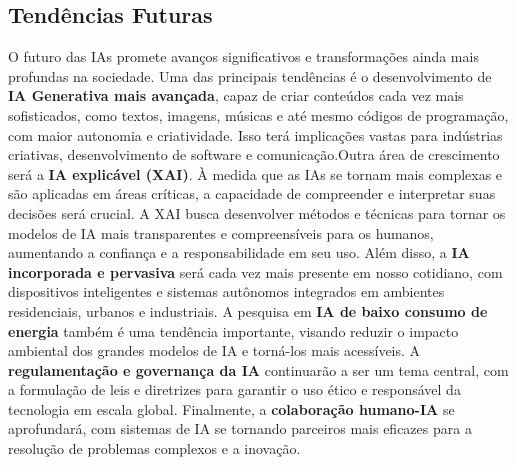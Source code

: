 \documentclass[12pt,a4paper]{article}
\begin{document}
    \subsection{Tendências Futuras}

      O futuro das IAs promete avanços significativos e transformações ainda mais profundas na sociedade. Uma das principais tendências é o desenvolvimento 
    de \textbf{IA Generativa mais avançada}, capaz de criar conteúdos cada vez mais sofisticados, como textos, imagens, músicas e até mesmo códigos de programação, 
    com maior autonomia e criatividade. Isso terá implicações vastas para indústrias criativas, desenvolvimento de software e comunicação.Outra área de crescimento 
    será a \textbf{IA explicável (XAI)}. À medida que as IAs se tornam mais complexas e são aplicadas em áreas críticas, a capacidade de compreender e interpretar suas 
    decisões será crucial. A XAI busca desenvolver métodos e técnicas para tornar os modelos de IA mais transparentes e compreensíveis para os humanos, aumentando a 
    confiança e a responsabilidade em seu uso. Além disso, a \textbf{IA incorporada e pervasiva} será cada vez mais presente em nosso cotidiano, com dispositivos inteligentes e sistemas autônomos integrados em ambientes residenciais, urbanos e industriais.
    A pesquisa em \textbf{IA de baixo consumo de energia} também é uma tendência importante, visando reduzir o impacto ambiental dos grandes modelos de IA e torná-los 
    mais acessíveis. A \textbf{regulamentação e governança da IA} continuarão a ser um tema central, com a formulação de leis e diretrizes para garantir o uso ético e 
    responsável da tecnologia em escala global. Finalmente, a \textbf{colaboração humano-IA} se aprofundará, com sistemas de IA se tornando parceiros mais eficazes para 
    a resolução de problemas complexos e a inovação.
\end{document}
